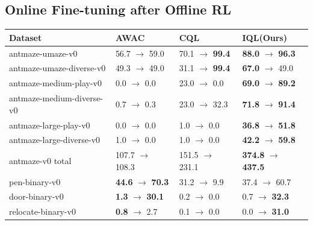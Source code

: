 \documentclass{article} %
\def\ourname{IQL\xspace}
\begin{document}
\vspace{-0.2cm}
\subsection{Online Fine-tuning after Offline RL}
\vspace{-0.2cm}

\label{sec:finetune}

\begin{table}
\scriptsize
\begin{tabular}{ l ||p{1.5cm} |p{1.5cm} | p{1.5cm}  }
    \centering
    Dataset & AWAC & CQL & \ourname (Ours) \\
    \hline
    antmaze-umaze-v0 & 56.7 \; $\rightarrow$ 59.0 & 70.1 \; $\rightarrow$ \textbf{99.4} & \textbf{88.0} \; $\rightarrow$ \textbf{96.3} \\
    antmaze-umaze-diverse-v0 & 49.3 \; $\rightarrow$ 49.0 & 31.1 \; $\rightarrow$ \textbf{99.4} & \textbf{67.0} \; $\rightarrow$ 49.0\\
    antmaze-medium-play-v0 & 0.0 \; \; $\rightarrow$ 0.0 & 23.0 \; $\rightarrow$ 0.0 & \textbf{69.0} \; $\rightarrow$ \textbf{89.2} \\
    antmaze-medium-diverse-v0 & 0.7 \; \; $\rightarrow$ 0.3 & 23.0 \; $\rightarrow$ 32.3 & \textbf{71.8} \; $\rightarrow$ \textbf{91.4} \\
    antmaze-large-play-v0 & 0.0 \; \; $\rightarrow$ 0.0 & 1.0 \; \; $\rightarrow$ 0.0 & \textbf{36.8} \; $\rightarrow$ \textbf{51.8} \\
    antmaze-large-diverse-v0 & 1.0 \; \; $\rightarrow$ 0.0 & 1.0 \; \; $\rightarrow$ 0.0 & \textbf{42.2} \; $\rightarrow$ \textbf{59.8} \\ \hline
    antmaze-v0 total & 107.7 $\rightarrow$ 108.3 & 151.5 $\rightarrow$ 231.1 & \textbf{374.8} $\rightarrow$ \textbf{437.5} \\ \hline
    pen-binary-v0 & \textbf{44.6} \; $\rightarrow$ \textbf{70.3} & 31.2 \; $\rightarrow$ 9.9 & 37.4 \; $\rightarrow$ 60.7 \\
    door-binary-v0 & \textbf{1.3} \; \; $\rightarrow$ \textbf{30.1} & 0.2 \; \; $\rightarrow$ 0.0 & 0.7 \; \; $\rightarrow$ \textbf{32.3} \\
    relocate-binary-v0 & \textbf{0.8} \; \; $\rightarrow$ 2.7 & 0.1 \; \; $\rightarrow$ 0.0 & 0.0 \; \; $\rightarrow$ \textbf{31.0} \\ \hline

\end{tabular}
\end{table}
\end{document}
